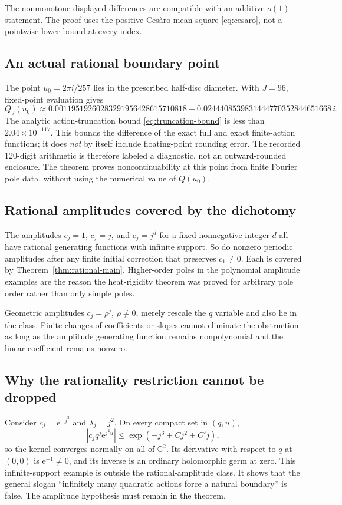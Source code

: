 \documentclass[11pt,a4paper]{article}
\numberwithin{equation}{section}
\theoremstyle{definition}
\theoremstyle{remark}
\newcommand{\C}{\mathbb C}
\newcommand{\ee}{\mathrm e}
\begin{document}
\begin{center}\small

\end{center}

The nonmonotone displayed differences are compatible with an additive
$o(1)$ statement.  The proof uses the positive Ces\`aro mean square
\eqref{eq:cesaro}, not a pointwise lower bound at every index.

\subsection{An actual rational boundary point}
The point $u_0=2\pi i/257$ lies in the prescribed half-disc diameter.
With $J=96$, fixed-point evaluation gives
\[
 Q_J(u_0)\approx
 0.00119519260283291956428615710818
 +0.0244408539831444770352844651668\,i.
\]
The analytic action-truncation bound
\eqref{eq:truncation-bound} is less than
$2.04\times10^{-117}$.  This bounds the difference of the exact full
and exact finite-action functions; it does \emph{not} by itself include
floating-point rounding error.  The recorded 120-digit arithmetic is
therefore labeled a diagnostic, not an outward-rounded enclosure.
The theorem proves noncontinuability at this point from finite Fourier
pole data, without using the numerical value of $Q(u_0)$.

\subsection{Rational amplitudes covered by the dichotomy}
The amplitudes $c_j=1$, $c_j=j$, and $c_j=j^d$ for a fixed nonnegative
integer $d$ all have rational generating functions with infinite support.
So do nonzero periodic amplitudes after any finite initial correction
that preserves $c_1\ne0$.  Each is covered by
Theorem~\ref{thm:rational-main}.  Higher-order poles in the polynomial
amplitude examples are the reason the heat-rigidity theorem was proved
for arbitrary pole order rather than only simple poles.

Geometric amplitudes $c_j=\rho^j$, $\rho\ne0$, merely rescale the
$q$ variable and also lie in the class.  Finite changes of coefficients
or slopes cannot eliminate the obstruction as long as the amplitude
generating function remains nonpolynomial and the linear coefficient
remains nonzero.

\subsection{Why the rationality restriction cannot be dropped}
Consider $c_j=\ee^{-j^3}$ and $\lambda_j=j^2$.
On every compact set in $(q,u)$,
\[
 |c_jq^j\ee^{j^2u}|
       \le\exp(-j^3+Cj^2+C'j),
\]
so the kernel converges normally on all of $\C^2$.
Its derivative with respect to $q$ at $(0,0)$ is $\ee^{-1}\ne0$,
and its inverse is an ordinary holomorphic germ at zero.
This infinite-support example is outside the rational-amplitude class.
It shows that the general slogan ``infinitely many quadratic actions
force a natural boundary'' is false.  The amplitude hypothesis must
remain in the theorem.
\end{document}
